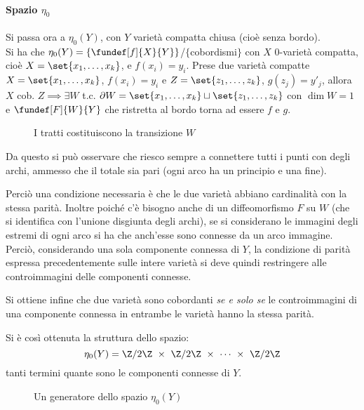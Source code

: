 \paragraph{Spazio $\eta_0$}
Si passa ora a $\eta_0(Y)$, con $Y$ varietà compatta chiusa (cioè senza bordo). \\
Si ha che $\eta_0(Y) = \{\fundef[f]{X}{Y}\}$/$\{$cobordismi$\}$ con $X$ 0-varietà compatta, cioè $X = \set{x_1, \dots, x_k}$, e $f(x_i) = y_i$.
Prese due varietà compatte $X = \set{x_1, \dots, x_k}$, $f(x_i) = y_i$ e $Z = \set{z_1, \dots, z_k}$, $g(z_j) = y'_j$, allora $X$ cob. $Z \implies \exists W$ t.c. $\partial W = \set{x_1, \dots, x_k}\sqcup\set{z_1, \dots, z_k}$ con $\dim W = 1$ e $\fundef[F]{W}{Y}$ che ristretta al bordo torna ad essere $f$ e $g$.
\begin{es}

\begin{figure}[h]
\centering

\caption{I tratti costituiscono la transizione $W$}
\end{figure}
Da questo si può osservare che riesco sempre a connettere tutti i punti con degli archi, ammesso che il totale sia pari (ogni arco ha un principio e una fine).
\end{es}
Perciò una condizione necessaria è che le due varietà abbiano cardinalità con la stessa parità. Inoltre poiché c'è bisogno anche di un diffeomorfismo $F$ su $W$ (che si identifica con l'unione disgiunta degli archi), se si considerano le immagini degli estremi di ogni arco si ha che anch'esse sono connesse da un arco immagine. Perciò, considerando una sola componente connessa di $Y$, la condizione di parità espressa precedentemente sulle intere varietà si deve quindi restringere alle controimmagini delle componenti connesse.

Si ottiene infine che due varietà sono cobordanti \emph{se e solo se} le controimmagini di una componente connessa in entrambe le varietà hanno la stessa parità.

Si è così ottenuta la struttura dello spazio: 
\begin{equation*}
\eta_0(Y) = \Z/2\Z~\times~\Z/2\Z~\times~\cdots~\times~\Z/2\Z
\end{equation*}
tanti termini quante sono le componenti connesse di $Y$.

\begin{figure}[h]
\centering

\caption{Un generatore dello spazio $\eta_0(Y)$}
\end{figure}

